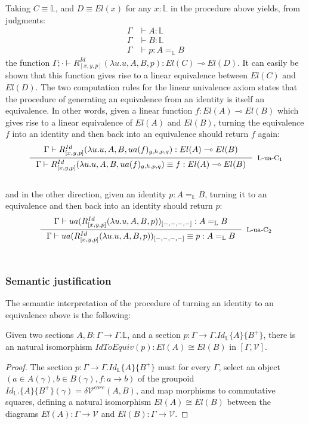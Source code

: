 \documentclass[a4paper,english]{lipics-v2018}
\begin{document}
    Taking $C \equiv \mathbb{L}$, and $D \equiv El(x)$ for any $x : \mathbb{L}$ in the procedure above yields, from judgments:
    \[
      \begin{split}
        \Gamma &\vdash A : \mathbb{L}\\
        \Gamma &\vdash B : \mathbb{L}\\
        \Gamma &\vdash p : A =_{\mathbb{L}} B
      \end{split}
    \]
    the function $\Gamma; \cdot \vdash R^{Id}_{[x, y, p]}(\lambda u.u, A, B, p) : El(C) \multimap El(D)$.
    It can easily be shown that this function gives rise to a linear equivalence between $El(C)$ and $El(D)$.
    The two computation rules for the linear univalence axiom states that the procedure of generating an equivalence from an identity is itself an equivalence. In other words, given a linear function $f : El(A) \multimap El(B)$ which gives rise to a linear equivalence of $El(A)$ and $El(B)$, turning the equivalence $f$ into an identity and then back into an equivalence should return $f$ again:
  \[
    \inference{
      \Gamma \vdash R^{Id}_{[x, y, p]}(\lambda u.u, A, B, ua(f)_{g, h, p, q}) : El(A) \multimap El(B)}
    {\Gamma \vdash R^{Id}_{[x, y, p]}(\lambda u.u, A, B, ua(f)_{g, h, p, q}) \equiv f : El(A) \multimap El(B)}
    [L-ua-C$_1$]
  \]\\
  and in the other direction, given an identity $p : A =_{\mathbb{L}} B$, turning it to an equivalence and then back into an identity should return $p$:
    \[
    \inference{
      \Gamma \vdash ua(R^{Id}_{[x, y, p]}(\lambda u.u, A, B, p))_{[-,-,-,-]} : A =_\mathbb{L} B}
    {\Gamma \vdash ua(R^{Id}_{[x, y, p]}(\lambda u.u, A, B, p))_{[-,-,-,-]} \equiv p : A =_{\mathbb{L}} B}
    [L-ua-C$_2$]
  \]\\
  \subsubsection{Semantic justification}
  The semantic interpretation of the procedure of turning an identity to an equivalence above is the following:
  \begin{lemma}Given two sections $A, B : \Gamma \to \Gamma.\mathbb{L}$, and a section $p : \Gamma \to \Gamma.Id_{\mathbb{L}}\{A\}\{B^+\}$, there is an natural isomorphism $IdToEquiv(p) : El(A) \cong El(B)$ in $[\Gamma, \mathcal{V}]$.
    \begin{proof}The section $p : \Gamma \to \Gamma.Id_{\mathbb{L}}\{A\}\{B^+\}$ must for every $\Gamma$, select an object $(a \in A(\gamma), b \in B(\gamma), f : a \to b)$ of the groupoid $Id_{\mathbb{L}}.\{A\}\{B^+\}(\gamma) = \delta \mathcal{V}^{core}(A,B)$, and map morphisms to commutative squares, defining a natural isomorphism $El(A) \cong El(B)$ between the diagrams $El(A) : \Gamma \to \mathcal{V}$ and $El(B) : \Gamma \to \mathcal{V}$.
    \end{proof}
  \end{lemma}
 
\end{document}
